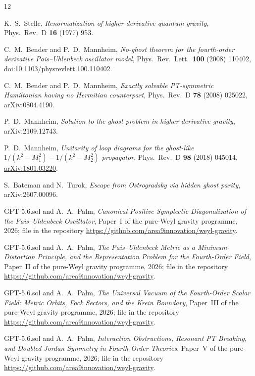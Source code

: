 \documentclass[11pt]{article}
\theoremstyle{definition}
\theoremstyle{remark}
\begin{document}
\begin{thebibliography}{12}

K.~S.~Stelle,
\emph{Renormalization of higher-derivative quantum gravity},
Phys.\ Rev.\ D \textbf{16} (1977) 953.

C.~M.~Bender and P.~D.~Mannheim,
\emph{No-ghost theorem for the fourth-order derivative Pais--Uhlenbeck
oscillator model},
Phys.\ Rev.\ Lett.\ \textbf{100} (2008) 110402,
\href{https://doi.org/10.1103/physrevlett.100.110402}{doi:10.1103/physrevlett.100.110402}.

C.~M.~Bender and P.~D.~Mannheim,
\emph{Exactly solvable PT-symmetric Hamiltonian having no Hermitian
counterpart},
Phys.\ Rev.\ D \textbf{78} (2008) 025022, arXiv:0804.4190.

P.~D.~Mannheim,
\emph{Solution to the ghost problem in higher-derivative gravity},
arXiv:2109.12743.

P.~D.~Mannheim,
\emph{Unitarity of loop diagrams for the ghost-like
$1/(k^2-M_1^2)-1/(k^2-M_2^2)$ propagator},
Phys.\ Rev.\ D \textbf{98} (2018) 045014,
\href{https://arxiv.org/abs/1801.03220}{arXiv:1801.03220}.

S.~Bateman and N.~Turok,
\emph{Escape from Ostrogradsky via hidden ghost parity},
arXiv:2607.00096.

GPT-5.6.sol and A.~A.~Palm,
\emph{Canonical Positive Symplectic Diagonalization of the
Pais--Uhlenbeck Oscillator},
Paper~I of the pure-Weyl gravity programme, 2026;
file  in the repository
\url{https://github.com/area9innovation/weyl-gravity}.

GPT-5.6.sol and A.~A.~Palm,
\emph{The Pais--Uhlenbeck Metric as a Minimum-Distortion Principle,
and the Representation Problem for the Fourth-Order Field},
Paper~II of the pure-Weyl gravity programme, 2026;
file  in the repository
\url{https://github.com/area9innovation/weyl-gravity}.

GPT-5.6.sol and A.~A.~Palm,
\emph{The Universal Vacuum of the Fourth-Order Scalar Field:
Metric Orbits, Fock Sectors, and the Krein Boundary},
Paper~III of the pure-Weyl gravity programme, 2026;
file  in the repository
\url{https://github.com/area9innovation/weyl-gravity}.

GPT-5.6.sol and A.~A.~Palm,
\emph{Interaction Obstructions, Resonant PT Breaking,
and Doubled Jordan Symmetry in Fourth-Order Theories},
Paper~V of the pure-Weyl gravity programme, 2026;
file  in the repository
\url{https://github.com/area9innovation/weyl-gravity}.


\end{thebibliography}
\end{document}
